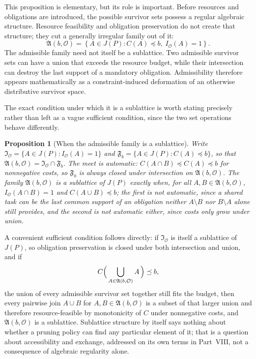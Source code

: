 \documentclass[11pt]{report}
\newtheorem*{frontproposition}{Proposition}
\begin{document}
This proposition is elementary, but its role is important. Before
resources and obligations are introduced, the possible survivor sets
possess a regular algebraic structure. Resource feasibility and
obligation preservation do not create that structure; they cut a
generally irregular family out of it:
\[
\mathfrak A(b,\mathcal O)
=
\left\{
A\in J(P):
C(A)\preceq b,\;
I_{\mathcal O}(A)=1
\right\}.
\]
The admissible family need not itself be a sublattice. Two admissible
survivor sets can have a union that exceeds the resource budget, while
their intersection can destroy the last support of a mandatory
obligation. Admissibility therefore appears mathematically as a
constraint-induced deformation of an otherwise distributive survivor
space.

The exact condition under which it is a sublattice is worth stating precisely rather than left as a vague sufficient condition, since the two set operations behave differently.

\begin{frontproposition}[When the admissible family is a sublattice]
Write $\mathfrak I_{\mathcal O} = \{A \in J(P) : I_{\mathcal O}(A) = 1\}$ and $\mathfrak F_b = \{A \in J(P) : C(A) \preceq b\}$, so that $\mathfrak A(b, \mathcal O) = \mathfrak I_{\mathcal O} \cap \mathfrak F_b$. The meet is automatic: $C(A \cap B) \preceq C(A) \preceq b$ for nonnegative costs, so $\mathfrak F_b$ is always closed under intersection on $\mathfrak A(b,\mathcal O)$. The family $\mathfrak A(b, \mathcal O)$ is a sublattice of $J(P)$ exactly when, for all $A, B \in \mathfrak A(b, \mathcal O)$, $I_{\mathcal O}(A \cap B) = 1$ and $C(A \cup B) \preceq b$; the first is not automatic, since a shared task can be the last common support of an obligation neither $A \setminus B$ nor $B \setminus A$ alone still provides, and the second is not automatic either, since costs only grow under union.
\end{frontproposition}

A convenient sufficient condition follows directly: if $\mathfrak I_{\mathcal O}$ is itself a sublattice of $J(P)$, so obligation preservation is closed under both intersection and union, and if
\[
C\Bigl(\, \bigcup_{A \in \mathfrak A(b, \mathcal O)} A \,\Bigr) \preceq b,
\]
the union of every admissible survivor set together still fits the budget, then every pairwise join $A \cup B$ for $A, B \in \mathfrak A(b, \mathcal O)$ is a subset of that larger union and therefore resource-feasible by monotonicity of $C$ under nonnegative costs, and $\mathfrak A(b, \mathcal O)$ is a sublattice. Sublattice structure by itself says nothing about whether a pruning policy can find any particular element of it; that is a question about accessibility and exchange, addressed on its own terms in Part~VIII, not a consequence of algebraic regularity alone.
\end{document}
